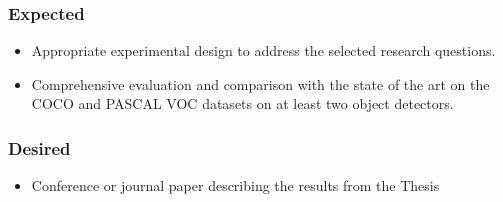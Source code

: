 \documentclass[thesis]{mas_proposal}
\begin{document}
\subsubsection*{Expected}
\begin{itemize}
    \item Appropriate experimental design to address the selected research questions.
    \item Comprehensive evaluation and comparison with the state of the art on the COCO and PASCAL VOC datasets on at least two object detectors.
\end{itemize}

\subsubsection*{Desired}
\begin{itemize}
    \item  Conference or journal paper describing the results from the Thesis
\end{itemize}


\nocite{*}

\end{document}
